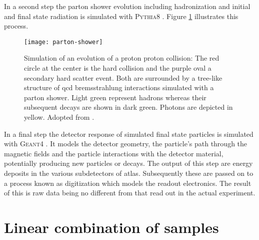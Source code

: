 In a second step the parton shower evolution including hadronization and initial and final state radiation is simulated with \textsc{Pythia8} \citep{Sjostrand:2014zea}. Figure \ref{fig:parton_shower} illustrates this process.
\begin{figure}[]
    \centering
    \texttt{[image: parton-shower]}
    \caption{Simulation of an evolution of a proton proton collision: The red circle at the center is the hard collision and the purple oval a secondary hard scatter event. Both are surrounded by a tree-like structure of \ac{qcd} bremsstrahlung interactions simulated with a parton shower. Light green represent hadrons whereas their subsequent decays are shown in dark green. Photons are depicted in yellow. Adopted from \citep{Hoche:2014rga}.
        \label{fig:parton_shower}}
\end{figure}

In a final step the detector response of simulated final state particles is simulated with \textsc{Geant}4 \citep{Agostinelli:2002hh}. It models the detector geometry, the particle's path through the magnetic fields and the particle interactions with the detector material, potentially producing new particles or decays. The output of this step are energy deposits in the various subdetectors of \ac{atlas}. Subsequently these are passed on to a process known as digitization which models the readout electronics. The result of this is raw data being no different from that read out in the actual experiment.


\section{Linear combination of samples}\label{sec:linear_combination}
\newcommand{\kl}{\kappa_\lambda}
\newcommand{\kt}{\kappa_t}
\newcommand{\kvv}{\kappa_\text{2V}}
\newcommand{\kv}{\kappa_\text{V}}
\newcommand{\mhh}{m_\text{HH}}

